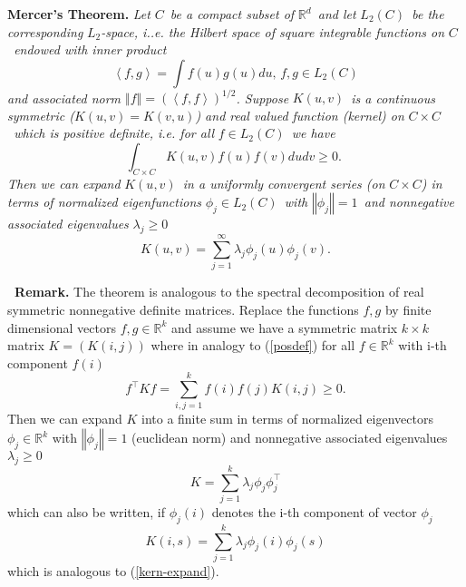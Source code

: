 \documentclass[11pt,twoside]{article}%
\theoremstyle{change}
\begin{document}
\textbf{Mercer's Theorem. } \textit{Let }$C$\textit{\ be a compact subset of
}$\mathbb{R}^{d}$\textit{\ and let }$L_{2}(C)$\textit{\ be the corresponding
}$L_{2}$\textit{-space, i..e. the Hilbert space of square integrable functions
on }$C$\textit{\ endowed with inner product }%
\[
\left\langle f,g\right\rangle =\int f(u)g(u)du\text{, }f,g\in L_{2}(C)
\]
\textit{and associated norm }$\left\Vert f\right\Vert =\left(  \left\langle
f,f\right\rangle \right)  ^{1/2}$\textit{. Suppose }$K(u,v)$\textit{\ is a
continuous symmetric (}$K(u,v)=K(v,u)$\textit{) and real valued function
(kernel) on }$C\times C$\textit{\ which is positive definite, i.e. for all
}$f\in L_{2}(C)$\textit{\ we have}%
\begin{equation}
\int_{C\times C}K(u,v)f(u)f(v)dudv\geq0\text{. }\label{posdef}%
\end{equation}
\textit{Then we can expand }$K(u,v)$\textit{\ in a uniformly convergent series
(on }$C\times C$\textit{) in terms of normalized eigenfunctions }$\phi_{j}\in
L_{2}(C)$\textit{\ with }$\left\Vert \phi_{j}\right\Vert =1$\textit{\ and
nonnegative associated eigenvalues }$\lambda_{j}\geq0$%
\begin{equation}
K(u,v)=\sum_{j=1}^{\infty}\lambda_{j}\phi_{j}(u)\phi_{j}%
(v).\label{kern-expand}%
\end{equation}


\bigskip

\bigskip

\textbf{\ Remark. }The theorem is analogous to the spectral decomposition of
real symmetric nonnegative definite matrices. Replace the functions $f,g$ by
finite dimensional vectors $f,g\in\mathbb{R}^{k}$ and assume we have a
symmetric matrix $k\times k$ matrix $K=\left(  K(i,j)\right)  $ where in
analogy to (\ref{posdef}) for all $f\in\mathbb{R}^{k}$ with i-th component
$f(i)$%
\[
f^{\top}Kf=\sum_{i,j=1}^{k}f(i)f(j)K(i,j)\geq0.
\]
Then we can expand $K$ into a finite sum in terms of normalized eigenvectors
$\phi_{j}\in\mathbb{R}^{k}$ with $\left\Vert \phi_{j}\right\Vert =1$
(euclidean norm) and nonnegative associated eigenvalues $\lambda_{j}\geq0$
\[
K=\sum_{j=1}^{k}\lambda_{j}\phi_{j}\phi_{j}^{\top}%
\]
which can also be written, if $\phi_{j}(i)$ denotes the i-th component of
vector $\phi_{j}$
\[
K(i,s)=\sum_{j=1}^{k}\lambda_{j}\phi_{j}(i)\phi_{j}(s)
\]
which is analogous to (\ref{kern-expand}).

\bigskip
\end{document}
